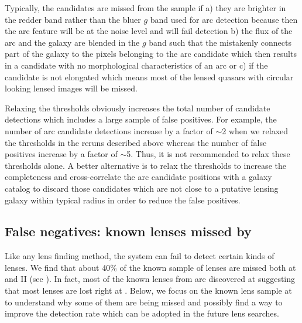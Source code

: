 \documentclass[useAMS,usenatbib,a4paper]{mn2e}
\begin{document}
Typically, the candidates are missed from the \af sample if a) they are
brighter in the redder band rather than the bluer $g$ band used for arc
detection because then the arc feature will be at the noise level and
will fail detection b) the flux of the arc and the galaxy are
blended in the $g$ band such that the \af mistakenly connects part of the
galaxy to the pixels belonging to the arc candidate which then results in a
candidate with no morphological characteristics of an arc or c) if the
candidate is not elongated which means most of the lensed quasars with
circular looking lensed images will be missed.

Relaxing the thresholds obviously increases the total number of
candidate detections which includes a large sample of false positives.
For example, the number of arc candidate detections increase by a factor
of $\sim$2 when we relaxed the thresholds in the reruns described above
whereas the number of false positives increase by a factor of $\sim$5.
Thus, it is not recommended to relax these thresholds alone. A better
alternative is to relax the thresholds to increase the completeness and
cross-correlate the arc candidate positions with a galaxy catalog to
discard those candidates which are not close to a putative lensing
galaxy within typical radius in order to reduce the false positives.




\subsection{False negatives: known lenses missed by \sw}
\label{sec:fn}
Like any lens finding method, the \sw system can fail to detect certain
kinds of lenses.  We find that about 40\% of the known sample of lenses
are missed both at \StageOne and II (see ). In fact, most
of the known lenses from \StageOne are discovered at \StageTwo suggesting
that most lenses are lost right at \StageOne. Below, we focus on the known
lens sample at \StageOne to understand why some of them are being missed
and possibly find a way to improve the detection rate which can be
adopted in the future \sw lens searches.
\end{document}
